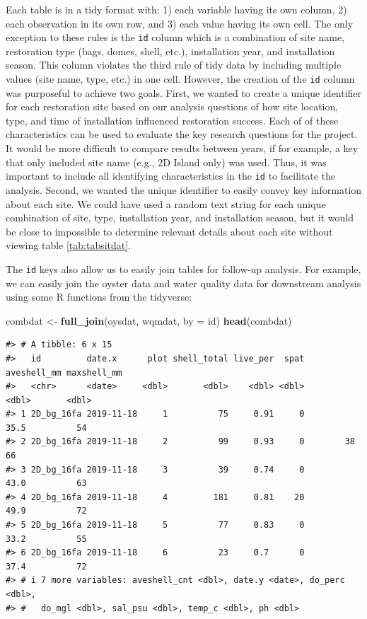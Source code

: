 \documentclass[
]{book}
\newenvironment{Shaded}{\begin{snugshade}}{\end{snugshade}}
\newcommand{\AttributeTok}[1]{\textcolor[rgb]{0.13,0.29,0.53}{#1}}
\newcommand{\FunctionTok}[1]{\textcolor[rgb]{0.13,0.29,0.53}{\textbf{#1}}}
\newcommand{\NormalTok}[1]{#1}
\newcommand{\OtherTok}[1]{\textcolor[rgb]{0.56,0.35,0.01}{#1}}
\newcommand{\StringTok}[1]{\textcolor[rgb]{0.31,0.60,0.02}{#1}}
\begin{document}
Each table is in a tidy format with: 1) each variable having its own column, 2) each observation in its own row, and 3) each value having its own cell. The only exception to these rules is the \texttt{id} column which is a combination of site name, restoration type (bags, domes, shell, etc.), installation year, and installation season. This column violates the third rule of tidy data by including multiple values (site name, type, etc.) in one cell. However, the creation of the \texttt{id} column was purposeful to achieve two goals. First, we wanted to create a unique identifier for each restoration site based on our analysis questions of how site location, type, and time of installation influenced restoration success. Each of of these characteristics can be used to evaluate the key research questions for the project. It would be more difficult to compare results between years, if for example, a key that only included site name (e.g., 2D Island only) was used. Thus, it was important to include all identifying characteristics in the \texttt{id} to facilitate the analysis. Second, we wanted the unique identifier to easily convey key information about each site. We could have used a random text string for each unique combination of site, type, installation year, and installation season, but it would be close to impossible to determine relevant details about each site without viewing table \ref{tab:tabsitdat}.

The \texttt{id} keys also allow us to easily join tables for follow-up analysis. For example, we can easily join the oyster data and water quality data for downstream analysis using some R functions from the tidyverse:

\begin{Shaded}
\begin{Highlighting}[]
\NormalTok{combdat }\OtherTok{\textless{}{-}} \FunctionTok{full\_join}\NormalTok{(oysdat, wqmdat, }\AttributeTok{by =} \StringTok{\textquotesingle{}id\textquotesingle{}}\NormalTok{)}
\FunctionTok{head}\NormalTok{(combdat)}
\end{Highlighting}
\end{Shaded}

\begin{verbatim}
#> # A tibble: 6 x 15
#>   id         date.x      plot shell_total live_per  spat aveshell_mm maxshell_mm
#>   <chr>      <date>     <dbl>       <dbl>    <dbl> <dbl>       <dbl>       <dbl>
#> 1 2D_bg_16fa 2019-11-18     1          75     0.91     0        35.5          54
#> 2 2D_bg_16fa 2019-11-18     2          99     0.93     0        38            66
#> 3 2D_bg_16fa 2019-11-18     3          39     0.74     0        43.0          63
#> 4 2D_bg_16fa 2019-11-18     4         181     0.81    20        49.9          72
#> 5 2D_bg_16fa 2019-11-18     5          77     0.83     0        33.2          55
#> 6 2D_bg_16fa 2019-11-18     6          23     0.7      0        37.4          72
#> # i 7 more variables: aveshell_cnt <dbl>, date.y <date>, do_perc <dbl>,
#> #   do_mgl <dbl>, sal_psu <dbl>, temp_c <dbl>, ph <dbl>
\end{verbatim}
\end{document}
